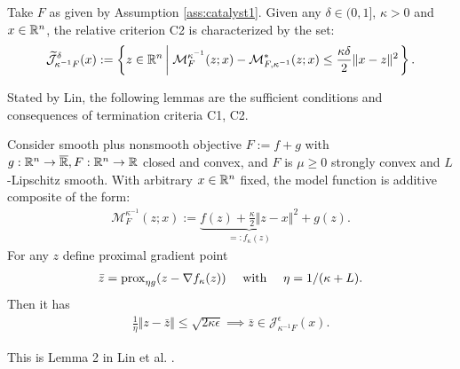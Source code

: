 \documentclass[12pt]{article}
\begin{document}
        \begin{definition}\label{def:catalyst-termination-c2}
            Take $F$ as given by Assumption \ref{ass:catalyst1}. 
            Given any $\delta \in (0, 1]$, $\kappa > 0$ and $x \in \mathbb R^n$, the relative criterion C2 is characterized by the set: 
            \begin{align*}
                \widetilde{\mathcal J}_{\kappa^{-1}F}^\delta (x)
                := 
                \left\lbrace
                    z \in \mathbb R^n \left| \;
                        \mathcal M_F^{\kappa^{-1}}(z; x) - 
                        \mathcal M^*_{F, \kappa^{-1}}(z; x) 
                        \le \frac{\kappa\delta}{2}\Vert x - z\Vert^2
                    \right.
                \right\rbrace. 
            \end{align*}
        \end{definition}
        Stated by Lin, the following lemmas are the sufficient conditions and consequences of termination criteria C1, C2. 

        \begin{lemma}\label{lemma:sufficient-c1}
            Consider smooth plus nonsmooth objective $F := f + g$ with $g:\mathbb R^n \rightarrow \overline {\mathbb R}, F:\mathbb R^n \rightarrow \mathbb R$ closed and convex, and $F$ is $\mu\ge 0$ strongly convex and $L$-Lipschitz smooth. 
            With arbitrary $x \in \mathbb R^n$ fixed, the model function is additive composite of the form: 
            \begin{align*}
                \mathcal M_F^{\kappa^{-1}}(z; x) := 
                \underbrace{f(z) + \frac{\kappa}{2}\Vert z - x\Vert^2}_{=: f_\kappa (z)}
                 + g(z). 
            \end{align*}
            For any $z$ define proximal gradient point 
            \begin{align*}
                \bar z = \operatorname{prox}_{\eta g}(z - \nabla f_\kappa(z)) 
                \quad 
                \text{ with } \quad  \eta = 1/(\kappa + L). 
            \end{align*}
            Then it has 
            \begin{align*}
                \frac{1}{\eta}\Vert z - \bar z\Vert
                \le \sqrt{2\kappa \epsilon} \implies 
                \bar z \in \mathcal 
                J_{\kappa^{-1}F}^\epsilon (x). 
            \end{align*}
        \end{lemma}
        \begin{remark}
            This is Lemma 2 in Lin et al. \cite{lin_catalyst_2018}. 
        \end{remark}
\end{document}
